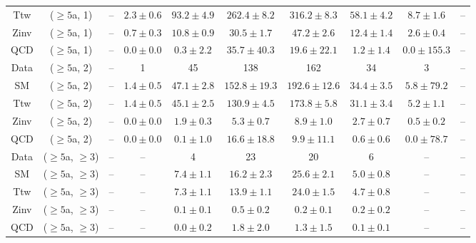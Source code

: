 \begin{table}[h!]
{\begin{tabular}{cccccccccc}
	Ttw & ($\ge5$a, 1) & -- & $2.3\pm 0.6$ & $93.2\pm 4.9$ & $262.4\pm 8.2$ & $316.2\pm 8.3$ & $58.1\pm 4.2$ & $8.7\pm 1.6$ & -- \\[0.5ex] 
	Zinv & ($\ge5$a, 1) & -- & $0.7\pm 0.3$ & $10.8\pm 0.9$ & $30.5\pm 1.7$ & $47.2\pm 2.6$ & $12.4\pm 1.4$ & $2.6\pm 0.4$ & -- \\[0.5ex] 
	QCD & ($\ge5$a, 1) & -- & $0.0\pm 0.0$ & $0.3\pm 2.2$ & $35.7\pm 40.3$ & $19.6\pm 22.1$ & $1.2\pm 1.4$ & $0.0\pm 155.3$ & -- \\[0.5ex] 
	Data & ($\ge5$a, 2) & -- & 1 & 45 & 138 & 162 & 34 & 3 & -- \\[0.5ex] 
	SM & ($\ge5$a, 2) & -- & $1.4\pm 0.5$ & $47.1\pm 2.8$ & $152.8\pm 19.3$ & $192.6\pm 12.6$ & $34.4\pm 3.5$ & $5.8\pm 79.2$ & -- \\[0.5ex] 
	Ttw & ($\ge5$a, 2) & -- & $1.4\pm 0.5$ & $45.1\pm 2.5$ & $130.9\pm 4.5$ & $173.8\pm 5.8$ & $31.1\pm 3.4$ & $5.2\pm 1.1$ & -- \\[0.5ex] 
	Zinv & ($\ge5$a, 2) & -- & $0.0\pm 0.0$ & $1.9\pm 0.3$ & $5.3\pm 0.7$ & $8.9\pm 1.0$ & $2.7\pm 0.7$ & $0.5\pm 0.2$ & -- \\[0.5ex] 
	QCD & ($\ge5$a, 2) & -- & $0.0\pm 0.0$ & $0.1\pm 1.0$ & $16.6\pm 18.8$ & $9.9\pm 11.1$ & $0.6\pm 0.6$ & $0.0\pm 78.7$ & -- \\[0.5ex] 
	Data & ($\ge5$a, $\ge3$) & -- & -- & 4 & 23 & 20 & 6 & -- & -- \\[0.5ex] 
	SM & ($\ge5$a, $\ge3$) & -- & -- & $7.4\pm 1.1$ & $16.2\pm 2.3$ & $25.6\pm 2.1$ & $5.0\pm 0.8$ & -- & -- \\[0.5ex] 
	Ttw & ($\ge5$a, $\ge3$) & -- & -- & $7.3\pm 1.1$ & $13.9\pm 1.1$ & $24.0\pm 1.5$ & $4.7\pm 0.8$ & -- & -- \\[0.5ex] 
	Zinv & ($\ge5$a, $\ge3$) & -- & -- & $0.1\pm 0.1$ & $0.5\pm 0.2$ & $0.2\pm 0.1$ & $0.2\pm 0.2$ & -- & -- \\[0.5ex] 
	QCD & ($\ge5$a, $\ge3$) & -- & -- & $0.0\pm 0.2$ & $1.8\pm 2.0$ & $1.3\pm 1.5$ & $0.1\pm 0.1$ & -- & -- \\[0.5ex] 
	\hline
	\hline
\end{tabular}}
\end{table}
